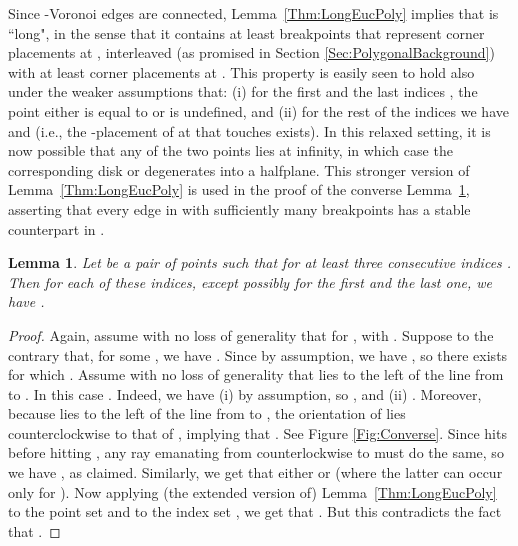 \documentclass[letter,11pt]{article}
\newtheorem{lemma}[theorem]{Lemma}
\begin{document}
Since -Voronoi edges are connected, Lemma~\ref{Thm:LongEucPoly} implies that  is ``long", in the sense that it contains at least  breakpoints that represent corner placements at , interleaved (as promised in Section \ref{Sec:PolygonalBackground}) with at least  corner placements at .
This property is easily seen to hold also under the weaker assumptions that: (i) for the first and the last indices , the point  either is equal to  or is undefined, and (ii) for the rest of the indices  we have  and  (i.e., the -placement of  at  that touches  exists).
In this relaxed setting, it is now possible that any of the two points  lies at infinity, in which case the corresponding disk  or  degenerates into a halfplane. This stronger version of 
Lemma~\ref{Thm:LongEucPoly} is used in the proof of the converse 
Lemma~\ref{Thm:LongPolygEuc}, asserting that every edge  in  with sufficiently many breakpoints has a stable counterpart  in .

\begin{lemma}\label{Thm:LongPolygEuc}
Let  be a pair of points such that  for at least three consecutive indices .
Then for each of these indices, except possibly for the first and the last one, we have .
\end{lemma}
\begin{proof} 
Again, assume with no
  loss of generality that  for , with
  .  Suppose to the contrary that, for some , we have .  Since 
  by assumption, we have , so there exists  for which
  .  Assume with no loss of generality
  that  lies to the left of the line from  to . In this case . Indeed, we have (i)  by assumption,
  so , and (ii) . Moreover,
  because  lies to the left of the line from  to , the orientation of  lies counterclockwise to that of ,
  implying that .
  See Figure \ref{Fig:Converse}. Since  hits  before hitting , any ray emanating from  counterlockwise to  must do the same, so we have , as claimed. Similarly, we get that either
   or
   (where the latter
  can occur only for ).  Now applying (the extended version of)
  Lemma~\ref{Thm:LongEucPoly} to the point set  and to
  the index set , we get that
  . But this
  contradicts the fact that .
\end{proof}
\end{document}
